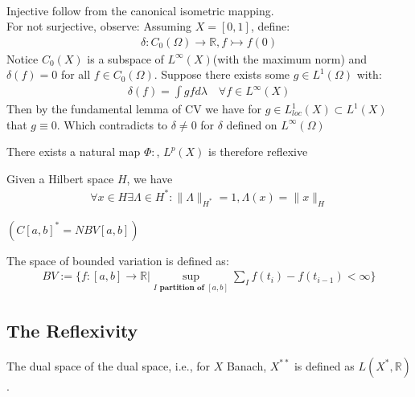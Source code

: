 \begin{example}\quad\\
Injective follow from the canonical isometric mapping.\\
For not surjective, observe:
Assuming $ X = [0, 1]$, define:
\begin{align*}
	\delta: C_0(\Omega) \rightarrow \mathbb{R}, f \rightarrowtail f(0)
\end{align*}	
Notice $C_0(X)$ is a subspace of $L^\infty(X)$(with the maximum norm) and $\delta(f) = 0$ for all $f \in C_0(\Omega)$. Suppose there exists some $g \in L^1(\Omega)$ with:
\begin{align*}
	\delta(f) = \int gf d\lambda \quad \forall f \in L^\infty(X)
\end{align*}
Then by the fundamental lemma of CV we have for $g \in L^1_{loc}(X) \subset L^1(X)$ that $g \equiv 0$. Which contradicts to $\delta \neq 0$ for $\delta$ defined on $L^\infty(\Omega)$
\end{example}


\begin{corollary}
	There exists a natural map $\Phi:$, $L^p(X)$ is therefore reflexive
\end{corollary}

\begin{lemma}
	Given a Hilbert space $H$, we have
	\begin{align*}
		\forall x \in H \exists \Lambda \in H^*: \|\Lambda\|_{H^*} = 1, \Lambda(x) = \|x\|_H
	\end{align*}
\end{lemma}


\begin{example}$(C[a,b]^* = NBV[a, b])$
	
\end{example}

\begin{definition}
	The space of bounded variation is defined as:
	\begin{align*}
		BV:=\bigg \{ f:[a, b]\rightarrow \mathbb{R}\bigg| \sup_{I \textbf{ partition of }[a, b]} \sum_{I} f(t_i) - f(t_{i-1}) < \infty \bigg\}
	\end{align*}
\end{definition}

\subsection{The Reflexivity}
\begin{definition}
The dual space of the dual space, i.e., for $X$ Banach, $X^{**}$ is defined as $L(X^*, \mathbb{R})$. 
\end{definition}

